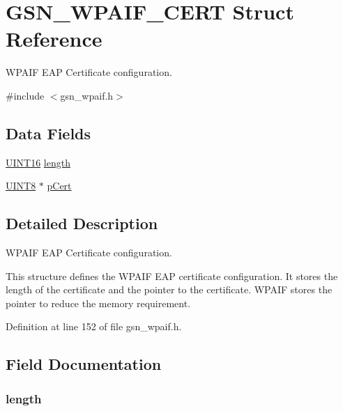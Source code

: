 \hypertarget{a00421}{
\section{GSN\_\-WPAIF\_\-CERT Struct Reference}
\label{a00421}
}


WPAIF EAP Certificate configuration.  




{\ttfamily \#include $<$gsn\_\-wpaif.h$>$}

\subsection*{Data Fields}
\begin{DoxyCompactItemize}
\item 
\hyperlink{a00660_ga09f1a1fb2293e33483cc8d44aefb1eb1}{UINT16} \hyperlink{a00421_a71481b9f18f454d77d36576f5b2bd1cd}{length}
\item 
\hyperlink{a00660_gab27e9918b538ce9d8ca692479b375b6a}{UINT8} $\ast$ \hyperlink{a00421_ab18aead7468d6de4bc6631f5638c8005}{pCert}
\end{DoxyCompactItemize}


\subsection{Detailed Description}
WPAIF EAP Certificate configuration. 

This structure defines the WPAIF EAP certificate configuration. It stores the length of the certificate and the pointer to the certificate. WPAIF stores the pointer to reduce the memory requirement. 

Definition at line 152 of file gsn\_\-wpaif.h.



\subsection{Field Documentation}
\hypertarget{a00421_a71481b9f18f454d77d36576f5b2bd1cd}{
\subsubsection[{length}]{ {\bf length}}}
\label{a00421_a71481b9f18f454d77d36576f5b2bd1cd}


